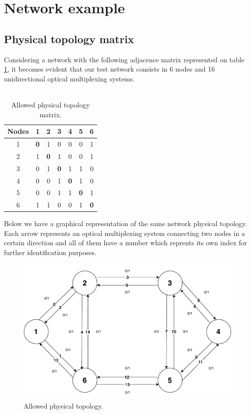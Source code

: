\clearpage
\section{Network example}
%
\subsection{Physical topology matrix}
Considering a network with the following adjacence matrix represented on table \ref{Adjacence_Matrix}, it becomes evident that our test network consists in 6 nodes and 16 unidirectional optical multiplexing systems.\\ \\
\begin{table}[H]
	\centering
	\begin{tabular}{|c|c|c|c|c|c|c|}
		\hline
		\textbf{Nodes} & 1 & 2 & 3 & 4 & 5 & 6 \\ \hline
		1     & \textbf{0} & 1 & 0 & 0 & 0 & 1 \\ \hline
		2     & 1 & \textbf{0} & 1 & 0 & 0 & 1 \\ \hline
		3     & 0 & 1 & \textbf{0} & 1 & 1 & 0 \\ \hline
		4     & 0 & 0 & 1 & \textbf{0} & 1 & 0 \\ \hline
		5     & 0 & 0 & 1 & 1 & \textbf{0} & 1 \\ \hline
		6     & 1 & 1 & 0 & 0 & 1 & \textbf{0} \\ \hline
	\end{tabular}
	\caption{Allowed physical topology matrix.}
	\label{Adjacence_Matrix}
\end{table}

Below we have a graphical representation of the same network physical topology. Each arrow represents an optical multiplexing system connecting two nodes in a certain direction and all of them have a number which reprents its own index for further identification purposes. \\
\begin{figure}[H]
	\centering
	\includegraphics[width=12cm]{sdf/heuristic/transparent/figures/physicalTopology}
	\caption{Allowed physical topology.}
	\label{allowed_physical_surv_transp}
\end{figure}

